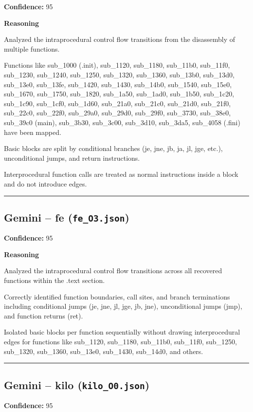 \textbf{Confidence:} 95

\textbf{Reasoning}

Analyzed the intraprocedural control flow transitions from the disassembly of multiple functions.

Functions like sub\_1000 (.init), sub\_1120, sub\_1180, sub\_11b0, sub\_11f0, sub\_1230, sub\_1240, sub\_1250, sub\_1320, sub\_1360, sub\_13b0, sub\_13d0, sub\_13e0, sub\_13fe, sub\_1420, sub\_1430, sub\_14b0, sub\_1540, sub\_15e0, sub\_1670, sub\_1750, sub\_1820, sub\_1a50, sub\_1ad0, sub\_1b50, sub\_1c20, sub\_1c90, sub\_1cf0, sub\_1d60, sub\_21a0, sub\_21c0, sub\_21d0, sub\_21f0, sub\_22c0, sub\_22f0, sub\_29a0, sub\_29d0, sub\_29f0, sub\_3730, sub\_38e0, sub\_39c0 (main), sub\_3b30, sub\_3c00, sub\_3d10, sub\_3da5, sub\_4058 (.fini) have been mapped.

Basic blocks are split by conditional branches (je, jne, jb, ja, jl, jge, etc.), unconditional jumps, and return instructions.

Interprocedural function calls are treated as normal instructions inside a block and do not introduce edges.

\bigskip
\hrule
\bigskip

\subsection{Gemini -- fe (\texttt{fe\_O3.json})}

\textbf{Confidence:} 95

\textbf{Reasoning}

Analyzed the intraprocedural control flow transitions across all recovered functions within the .text section.

Correctly identified function boundaries, call sites, and branch terminations including conditional jumps (je, jne, jl, jge, jb, jne), unconditional jumps (jmp), and function returns (ret).

Isolated basic blocks per function sequentially without drawing interprocedural edges for functions like sub\_1120, sub\_1180, sub\_11b0, sub\_11f0, sub\_1250, sub\_1320, sub\_1360, sub\_13e0, sub\_1430, sub\_14d0, and others.

\bigskip
\hrule
\bigskip

\subsection{Gemini -- kilo (\texttt{kilo\_O0.json})}

\textbf{Confidence:} 95

